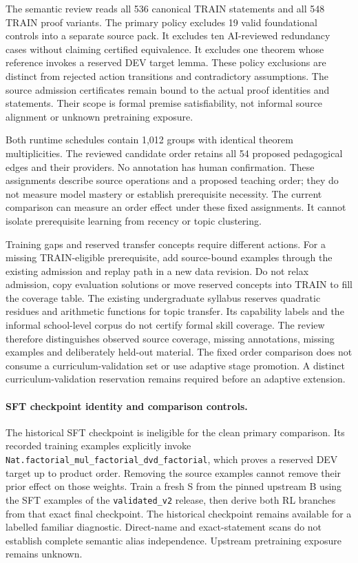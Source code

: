 \documentclass[11pt]{article}
\newcommand{\code}[1]{\texttt{#1}}
\newcommand{\pth}[1]{\nolinkurl{#1}}
\begin{document}
The semantic review reads all 536 canonical TRAIN statements and all 548 TRAIN proof variants.
The primary policy excludes 19 valid foundational controls into a separate source pack.
It excludes ten AI-reviewed redundancy cases without claiming certified equivalence.
It excludes one theorem whose reference invokes a reserved DEV target lemma.
These policy exclusions are distinct from rejected action transitions and contradictory assumptions.
The source admission certificates remain bound to the actual proof identities and statements.
Their scope is formal premise satisfiability, not informal source alignment or unknown pretraining exposure.

Both runtime schedules contain 1,012 groups with identical theorem multiplicities.
The reviewed candidate order retains all 54 proposed pedagogical edges and their providers.
No annotation has human confirmation.
These assignments describe source operations and a proposed teaching order; they do not measure model mastery or establish prerequisite necessity.
The current comparison can measure an order effect under these fixed assignments.
It cannot isolate prerequisite learning from recency or topic clustering.

Training gaps and reserved transfer concepts require different actions.
For a missing TRAIN-eligible prerequisite, add source-bound examples through the existing admission and replay path in a new data revision.
Do not relax admission, copy evaluation solutions or move reserved concepts into TRAIN to fill the coverage table.
The existing undergraduate syllabus reserves quadratic residues and arithmetic functions for topic transfer.
Its capability labels and the informal school-level corpus do not certify formal skill coverage.
The review therefore distinguishes observed source coverage, missing annotations, missing examples and deliberately held-out material.
The fixed order comparison does not consume a curriculum-validation set or use adaptive stage promotion.
A distinct curriculum-validation reservation remains required before an adaptive extension.

\paragraph{SFT checkpoint identity and comparison controls.}
The historical SFT checkpoint is ineligible for the clean primary comparison.
Its recorded training examples explicitly invoke \pth{Nat.factorial_mul_factorial_dvd_factorial}, which proves a reserved DEV target up to product order.
Removing the source examples cannot remove their prior effect on those weights.
Train a fresh S from the pinned upstream B using the SFT examples of the \code{validated\_v2} release, then derive both RL branches from that exact final checkpoint.
The historical checkpoint remains available for a labelled familiar diagnostic.
Direct-name and exact-statement scans do not establish complete semantic alias independence.
Upstream pretraining exposure remains unknown.
\end{document}
